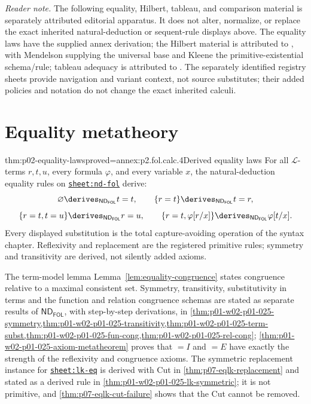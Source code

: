 \noindent\textit{Reader note.} The following equality, Hilbert, tableau, and
comparison material is separately attributed editorial apparatus.  It does
not alter, normalize, or replace the exact inherited natural-deduction or
sequent-rule displays above.  The equality laws have the supplied annex
derivation; the Hilbert material is attributed to
\cite{Mendelson1997,Kleene1952,Enderton2001}, with Mendelson supplying the
universal base and Kleene the primitive-existential schema/rule; tableau
adequacy is attributed to
\cite{Smullyan1968}.  The separately identified registry sheets provide
navigation and variant context, not source substitutes; their added policies
and notation do not change the exact inherited calculi.

\section{Equality metatheory}
\label{sec:p02-fol-equality-metatheory}

\begin{hbtheorem}{thm:p02-equality-laws}{proved=annex:p2.fol.calc.4}{Derived equality laws}
For all \(\mathcal L\)-terms \(r,t,u\), every formula \(\varphi\), and every
variable \(x\), the natural-deduction equality rules on
\hyperref[sheet:nd-fol]{\texttt{sheet:nd-fol}} derive:
\[
 \varnothing\derives_{\mathsf{ND}_{\mathsf{FOL}}}t=t,
 \qquad
 \{r=t\}\derives_{\mathsf{ND}_{\mathsf{FOL}}}t=r,
\]
\[
 \{r=t,t=u\}\derives_{\mathsf{ND}_{\mathsf{FOL}}}r=u,
 \qquad
 \{r=t,\varphi[r/x]\}
   \derives_{\mathsf{ND}_{\mathsf{FOL}}}\varphi[t/x].
\]
Every displayed substitution is the total capture-avoiding operation of the
syntax chapter.  Reflexivity and replacement are the registered primitive
rules; symmetry and transitivity are derived, not silently added axioms.
\end{hbtheorem}

The term-model lemma Lemma~\ref{lem:equality-congruence} states congruence
relative to a maximal consistent set.  Symmetry, transitivity, substitutivity
in terms and the function and relation congruence schemas are stated as
separate results of \(\mathsf{ND}_{\mathsf{FOL}}\), with step-by-step
derivations, in
\cref{thm:p01-w02-p01-025-symmetry,thm:p01-w02-p01-025-transitivity,thm:p01-w02-p01-025-term-subst,thm:p01-w02-p01-025-fun-cong,thm:p01-w02-p01-025-rel-cong};
\cref{thm:p01-w02-p01-025-axiom-metatheorem} proves that \(=I\) and \(=E\)
have exactly the strength of the reflexivity and congruence axioms.  The
symmetric replacement instance for
\hyperref[sheet:lk-eq]{\texttt{sheet:lk-eq}} is derived with Cut in
\cref{thm:p07-eqlk-replacement} and stated as a derived rule in
\cref{thm:p01-w02-p01-025-lk-symmetric}; it is not primitive, and
\cref{thm:p07-eqlk-cut-failure} shows that the Cut cannot be removed.

